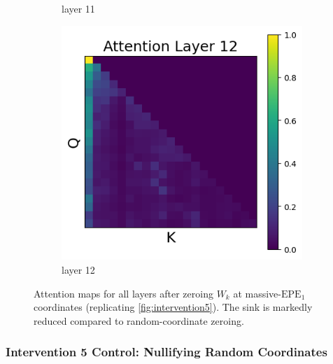 \documentclass[11pt]{article}
\begin{document}
\begin{figure}[t]
\begin{subfigure}[t]{0.24\textwidth}
    \caption{layer 11}
  \end{subfigure}\hfill
  \begin{subfigure}[t]{0.24\textwidth}
    \centering
    \includegraphics[width=1.4\columnwidth]{figures/intervention5/layer_12.png}
    \caption{layer 12}
  \end{subfigure}\hfill

  \caption{Attention maps for all layers after zeroing $W_k$ at massive-$\mathrm{EPE}_1$ coordinates (replicating \cref{fig:intervention5}). The sink is markedly reduced compared to random-coordinate zeroing.}
\end{figure}

\subsubsection{Intervention 5 Control: Nullifying Random Coordinates}\label{app:intervention5_2}
\end{document}
